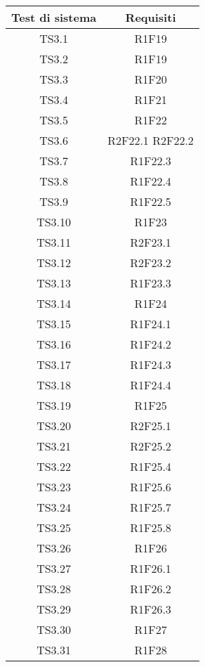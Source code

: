 \begin{center}
	\begin{longtable}{|c|c|}
	\hline
	\rowcolor{lighter-grayer}
	\textbf{Test di sistema} & \textbf{Requisiti} \\
	\hline
	\endfirsthead


	
	\hline
	TS3.1 &  R1F19 \\
	TS3.2 &  R1F19 \\
	TS3.3 &  R1F20 \\
	TS3.4 &  R1F21 \\
	TS3.5 &  R1F22 \\
	TS3.6 &  R2F22.1 R2F22.2 \\
	TS3.7 &  R1F22.3 \\
	TS3.8 &  R1F22.4 \\
	TS3.9 &  R1F22.5 \\
	TS3.10 & R1F23 \\
	TS3.11 & R2F23.1 \\
	TS3.12 & R2F23.2 \\
	TS3.13 & R1F23.3 \\
	TS3.14 & R1F24 \\
	TS3.15 & R1F24.1 \\
	TS3.16 & R1F24.2 \\
	TS3.17 & R1F24.3 \\
	TS3.18 & R1F24.4 \\
	TS3.19 & R1F25 \\
	TS3.20 & R2F25.1 \\
	TS3.21 & R2F25.2 \\
	TS3.22 & R1F25.4 \\
	TS3.23 & R1F25.6 \\
	TS3.24 & R1F25.7 \\
	TS3.25 & R1F25.8 \\
	TS3.26 & R1F26 \\
	TS3.27 & R1F26.1 \\
	TS3.28 & R1F26.2 \\
	TS3.29 & R1F26.3  \\
	TS3.30 & R1F27 \\
	TS3.31 & R1F28 \\
	\hline

	\end{longtable}
\end{center}



